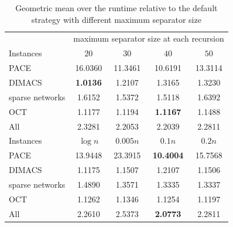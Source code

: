 \documentclass[12pt,a4paper,twoside]{scrartcl}
\numberwithin{equation}{section}
\begin{document}
\begin{table}[hbt!]
	\centering
	\begin{tabular}{l|cccc|}	  & \multicolumn{4}{c|}{maximum separator size at each recursion} \\ \cline{2-5}
		Instances & $20$ & $30$ & $40$ & $50$ \\
		\hline
		PACE & 16.0360 & 11.3461 & 10.6191 & 13.3114  \\
		DIMACS & \textbf{1.0136} & 1.2107 & 1.3165 & 1.3230  \\
		sparse networks & 1.6152 & 1.5372 & 1.5118 & 1.6392 \\
		OCT & 1.1177 & 1.1194 & \textbf{1.1167} & 1.1488 \\
		All & 2.3281 & 2.2053 & 2.2039 & 2.2811  \\ \hline \hline
		Instances & $\log n$ & $0.005n$ & $0.1n$ & $0.2n$ \\
		\hline
		PACE & 13.9448 & 23.3915 & \textbf{10.4004} & 15.7568  \\
		DIMACS & 1.1175 & 1.1507 & 1.2107 & 1.1506  \\
		sparse networks & 1.4890 & 1.3571 & 1.3335 & 1.3337 \\
		OCT & 1.1262 & 1.1346 & 1.1254 & 1.1197  \\
		All & 2.2610 & 2.5373 & \textbf{2.0773} & 2.2811  \\ \hline
	\end{tabular}
	\caption{Geometric mean over the runtime relative to the default strategy with different maximum separator size}
	\label{tab:thresh3}
	
\end{table}
\end{document}
